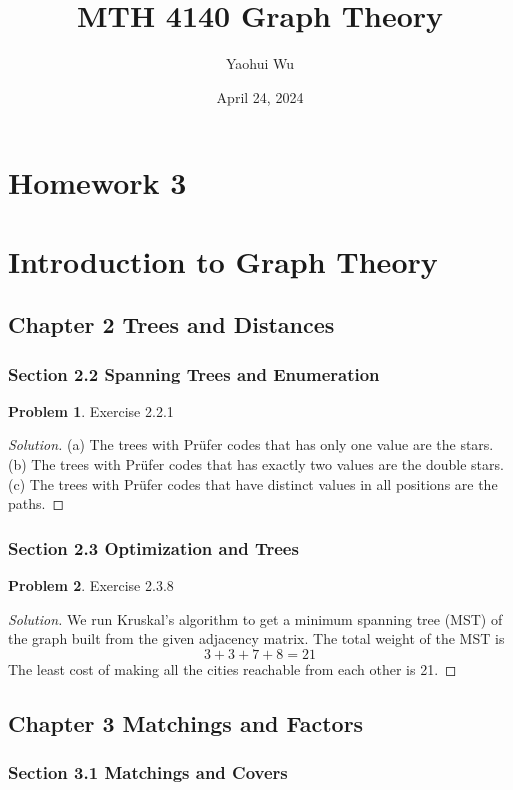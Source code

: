\documentclass[12pt]{article}
\title{MTH 4140 Graph Theory}
\author{Yaohui Wu}
\date{April 24, 2024}
\theoremstyle{definition}
\newtheorem{problem}{Problem}
\newenvironment*{solution}{\begin{proof}[Solution]}{\end{proof}}
\begin{document}
\maketitle
\section*{Homework 3}
\section*{Introduction to Graph Theory}

\subsection*{Chapter 2 Trees and Distances}
\subsubsection*{Section 2.2 Spanning Trees and Enumeration}
\begin{problem}
    Exercise 2.2.1
\end{problem}
\begin{solution}
    (a) The trees with Prüfer codes that has only one value are the stars. (b)
    The trees with Prüfer codes that has exactly two values are the double
    stars. (c) The trees with Prüfer codes that have distinct values in all
    positions are the paths.
\end{solution}

\subsubsection*{Section 2.3 Optimization and Trees}
\begin{problem}
    Exercise 2.3.8
\end{problem}
\begin{solution}
    We run Kruskal's algorithm to get a minimum spanning tree (MST) of the
    graph built from the given adjacency matrix. The total weight of the MST
    is \[3+3+7+8=21\] The least cost of making all the cities reachable from
    each other is 21.
\end{solution}

\subsection*{Chapter 3 Matchings and Factors}
\subsubsection*{Section 3.1 Matchings and Covers}
\end{document}

